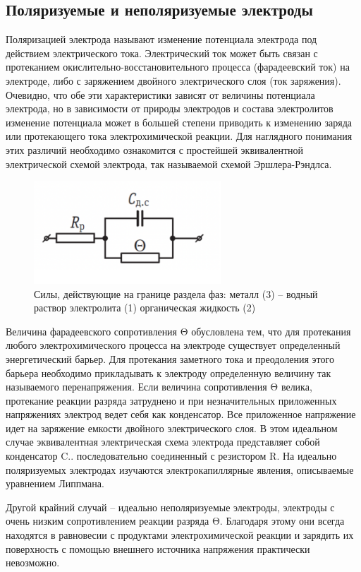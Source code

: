 \documentclass[a4paper,12pt]{article}
\begin{document}
\subsection{Поляризуемые и неполяризуемые электроды}
Поляризацией электрода называют изменение потенциала электрода под действием электрического тока. Электрический ток может быть связан с протеканием
окислительно-восстановительного процесса (фарадеевский ток) на электроде, либо с заряжением двойного электрического слоя (ток заряжения). Очевидно, что
обе эти характеристики зависят от величины потенциала электрода, но в зависимости от природы электродов и состава электролитов изменение потенциала может в большей степени приводить к изменению заряда или протекающего тока
электрохимической реакции. Для наглядного понимания этих различий необходимо ознакомится с простейшей эквивалентной электрической схемой электрода, так
называемой схемой Эршлера-Рэндлса.

\begin{figure}[h!]
    \centering
    \includegraphics[width=7cm]{2.png}
    \caption{Силы, действующие на границе раздела фаз: металл (3) – водный раствор электролита (1) органическая жидкость (2)}
    \label{fig:vac}
\end{figure}

Величина фарадеевского сопротивления Θ обусловлена тем, что для протекания любого электрохимического процесса на электроде существует определенный
энергетический барьер. Для протекания заметного тока и преодоления этого барьера необходимо прикладывать к электроду определенную величину так называемого перенапряжения. Если величина сопротивления Θ велика, протекание реакции разряда затруднено и при незначительных приложенных напряжениях электрод ведет себя как конденсатор. Все приложенное напряжение идет на заряжение
емкости двойного электрического слоя. В этом идеальном случае эквивалентная
электрическая схема электрода представляет собой конденсатор C.. последовательно соединенный с резистором R. На идеально поляризуемых электродах изучаются
электрокапиллярные явления, описываемые уравнением Липпмана.

Другой крайний случай – идеально неполяризуемые электроды, электроды с
очень низким сопротивлением реакции разряда Θ. Благодаря этому они всегда
находятся в равновесии с продуктами электрохимической реакции и зарядить их
поверхность с помощью внешнего источника напряжения практически невозможно.
\end{document}
